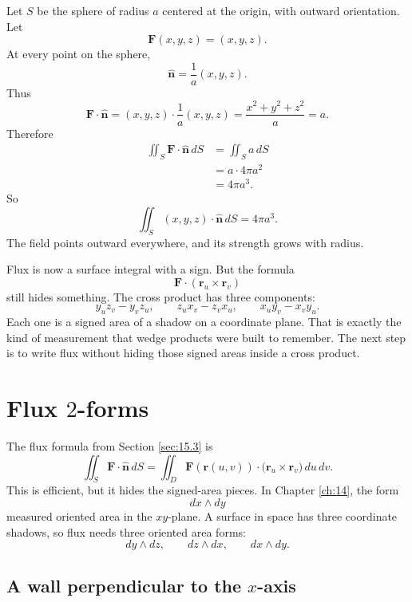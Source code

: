 \begin{example}
Let \(S\) be the sphere of radius \(a\) centered at the origin, with outward orientation.
Let
\[
    \mathbf F(x,y,z)=(x,y,z).
\]
At every point on the sphere,
\[
    \widehat{\mathbf n}=\frac{1}{a}(x,y,z).
\]
Thus
\[
    \mathbf F\cdot\widehat{\mathbf n}
    =
    (x,y,z)\cdot\frac{1}{a}(x,y,z)
    =
    \frac{x^2+y^2+z^2}{a}
    =
    a.
\]
Therefore
\[
\begin{aligned}
    \iint_S \mathbf F\cdot\widehat{\mathbf n}\,dS
    &=
    \iint_S a\,dS\\
    &=
    a\cdot 4\pi a^2\\
    &=
    4\pi a^3.
\end{aligned}
\]
So
\[
\boxed{
    \iint_S (x,y,z)\cdot\widehat{\mathbf n}\,dS=4\pi a^3.
}
\]
The field points outward everywhere, and its strength grows with radius.
\end{example}

Flux is now a surface integral with a sign.  But the formula
\[
    \mathbf F\cdot(\mathbf r_u\times\mathbf r_v)
\]
still hides something.  The cross product has three components:
\[
    y_u z_v-y_v z_u,
    \qquad
    z_u x_v-z_v x_u,
    \qquad
    x_u y_v-x_v y_u.
\]
Each one is a signed area of a shadow on a coordinate plane.  That is exactly the kind
of measurement that wedge products were built to remember.  The next step is to write
flux without hiding those signed areas inside a cross product.

\section{Flux \texorpdfstring{\(2\)}{2}-forms}
\label{sec:15.4}

The flux formula from Section \ref{sec:15.3} is
\[
    \iint_S \mathbf F\cdot\widehat{\mathbf n}\,dS
    =
    \iint_D
    \mathbf F(\mathbf r(u,v))\cdot
    \bigl(\mathbf r_u\times\mathbf r_v\bigr)\,du\,dv.
\]
This is efficient, but it hides the signed-area pieces.  In Chapter \ref{ch:14}, the form
\[
    dx\wedge dy
\]
measured oriented area in the \(xy\)-plane.  A surface in space has three coordinate
shadows, so flux needs three oriented area forms:
\[
    dy\wedge dz,\qquad dz\wedge dx,\qquad dx\wedge dy.
\]

\subsection{A wall perpendicular to the \(x\)-axis}

